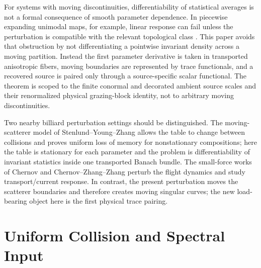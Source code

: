 \documentclass[11pt]{amsart}
\theoremstyle{compactplain}
\theoremstyle{compactdefinition}
\theoremstyle{compactremark}
\begin{document}
For systems with moving discontinuities, differentiability of statistical
averages is not a formal consequence of smooth parameter dependence.  In
piecewise expanding unimodal maps, for example, linear response can fail unless
the perturbation is compatible with the relevant topological class
\cite{BaladiSmania2008}.  This paper avoids that obstruction by not
differentiating a pointwise invariant density across a moving partition.
Instead the first parameter derivative is taken in transported anisotropic
fibers, moving boundaries are represented by trace functionals, and a recovered
source is paired only through a source-specific scalar functional.  The theorem is scoped
to the finite conormal and decorated ambient source scales and their renormalized physical
grazing-block identity, not to arbitrary moving discontinuities.

Two nearby billiard perturbation settings should be distinguished.  The
moving-scatterer model of Stenlund--Young--Zhang
\cite{StenlundYoungZhang2013} allows the table to change between collisions and
proves uniform loss of memory for nonstationary compositions; here the table is
stationary for each parameter and the problem is differentiability of invariant
statistics inside one transported Banach bundle.  The small-force works of
Chernov and Chernov--Zhang--Zhang
\cite{Chernov2001,ChernovZhangZhang2014} perturb the flight dynamics and study
transport/current response.  In contrast, the present perturbation moves the
scatterer boundaries and therefore creates moving singular curves; the new
load-bearing object here is the first physical trace pairing.

\section{Uniform Collision and Spectral Input}
\end{document}

